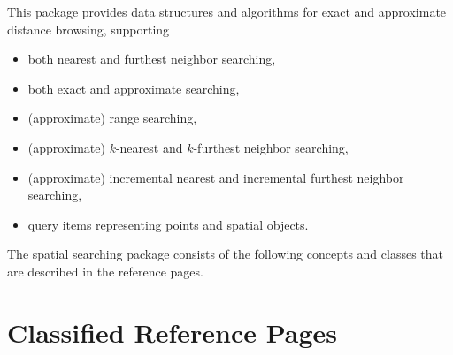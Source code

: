 \label{ChapterReferenceSpatialSearching}


This package provides data structures and algorithms for exact and approximate distance browsing,
supporting

\begin{itemize} 

\item
both nearest and furthest neighbor searching,

\item
both exact and approximate searching,

\item
(approximate) range searching,

\item 
(approximate) $k$-nearest and $k$-furthest neighbor searching,

\item 
(approximate) incremental nearest and incremental furthest neighbor searching,

\item
query items representing points and spatial objects.

\end{itemize}



The spatial searching package consists of the following concepts and
classes that are described in the reference pages.



\section{Classified Reference Pages}


 \\
 \\
 \\
 \\

